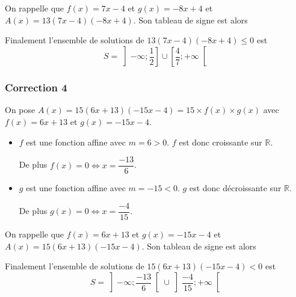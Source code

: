\documentclass[15pt, mathserif]{beamer}
\begin{document}
\begin{frame}On rappelle que $f(x) = 7x-4$ et $g(x) = -8x+4$ et $A(x) = 13(7x-4)(-8x+4)$. Son tableau de signe est alors 

\medskip \hfil
{}

 Finalement l'ensemble de solutions de $13(7x-4)(-8x+4)\leq0$ est\[S = \left]-\infty;\dfrac{1}{2}\right]\cup\left[\dfrac{4}{7};+\infty\right[\]

\end{frame}


\begin{frame}
\vspace{-10mm}
	\frametitle{Correction 4}
On pose $A(x) = 15(6x+13)(-15x-4) = 15\times f(x) \times g(x)$ avec $f(x) = 6x+13$ et $g(x) = -15x-4$.

\begin{itemize}
	\item $f$ est une fonction affine avec $m =6>0$. $f$ est donc croissante sur $\mathbb{R}$.

	 De plus $f(x) = 0 \Leftrightarrow x = \dfrac{-13}{6}$.
	\item $g$ est une fonction affine avec $m =-15<0$. $g$ est donc décroissante sur $\mathbb{R}$.

	 De plus $g(x) = 0 \Leftrightarrow x = \dfrac{-4}{15}$.
\end{itemize}

 \end{frame}


\begin{frame}On rappelle que $f(x) = 6x+13$ et $g(x) = -15x-4$ et $A(x) = 15(6x+13)(-15x-4)$. Son tableau de signe est alors 

\medskip \hfil
{}

 Finalement l'ensemble de solutions de $15(6x+13)(-15x-4)<0$ est\[S = \left]-\infty;\dfrac{-13}{6}\right[\cup\left]\dfrac{-4}{15};+\infty\right[\]

\end{frame}
\end{document}
